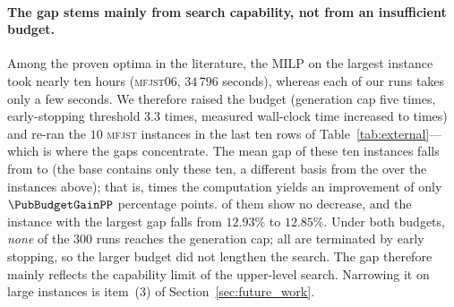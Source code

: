 \begin{table}[t]
\caption{Degenerate comparison on public benchmarks (exclusivity constraint removed; the same problem as in the literature). In the ``reference'' column,
\textsc{opt} denotes a MILP-proven optimum and \textsc{bk} a best published value; the gap is computed from the best
solution over \NSeeds{} seeds. An asterisk marks instances whose best solution is identical digit for digit to the reference value.}
\label{tab:external}
\centering
\small

\end{table}

\paragraph{The gap stems mainly from search capability, not from an insufficient budget.}
Among the \PubNOpt{} proven optima in the literature, the MILP on the largest instance took nearly ten hours (\textsc{mfjst}06, $34\,796$ seconds), whereas each of our runs takes only a few seconds. We therefore raised the budget (generation cap five times, early-stopping threshold $3.3$ times, measured wall-clock time increased to \PubBudgetRatio{} times) and re-ran the $10$ \textsc{mfjst} instances in the last ten rows of Table~\ref{tab:external}---which is where the gaps concentrate.
The mean gap of these ten instances falls from \PubGapLoBudget{} to \PubGapHiBudget{} (the base contains only these ten, a different basis from the \PubGapMean{} over the \PubNInst{} instances above); that is, \PubBudgetRatio{} times the computation yields an improvement of only $\PubBudgetGainPP$ percentage points. \PubBudgetNoGain{} of them show no decrease, and the instance with the largest gap falls from $12.93\%$ to $12.85\%$.
Under both budgets, \emph{none} of the $300$ runs reaches the generation cap; all are terminated by early stopping, so the larger budget did not lengthen the search. The gap therefore mainly reflects the capability limit of the upper-level search. Narrowing it on large instances is item~(3) of Section~\ref{sec:future_work}.

